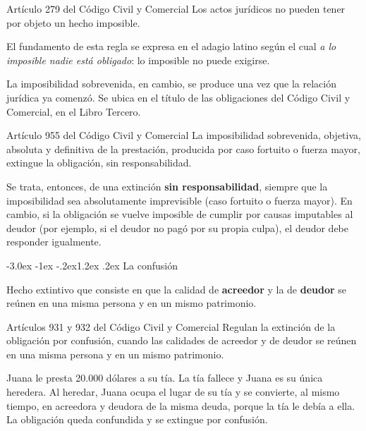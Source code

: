 \documentclass[12pt,oneside]{book}
\makeatletter
\renewcommand\section{\@startsection{section}{1}{\z@}%
  {-3.0ex \@plus -1ex \@minus -.2ex}{1.2ex \@plus .2ex}%
  {\normalfont\large\bfseries\color{acento}}}
\makeatother
\begin{document}
\begin{articulo}{Artículo 279 del Código Civil y Comercial}
Los actos jurídicos no pueden tener por objeto un hecho imposible.
\end{articulo}

El fundamento de esta regla se expresa en el adagio latino según el cual \textit{a lo imposible nadie está obligado}: lo imposible no puede exigirse.

La imposibilidad sobrevenida, en cambio, se produce una vez que la relación jurídica ya comenzó. Se ubica en el título de las obligaciones del Código Civil y Comercial, en el Libro Tercero.

\begin{articulo}{Artículo 955 del Código Civil y Comercial}
La imposibilidad sobrevenida, objetiva, absoluta y definitiva de la prestación, producida por caso fortuito o fuerza mayor, extingue la obligación, sin responsabilidad.
\end{articulo}

Se trata, entonces, de una extinción \textbf{sin responsabilidad}, siempre que la imposibilidad sea absolutamente imprevisible (caso fortuito o fuerza mayor). En cambio, si la obligación se vuelve imposible de cumplir por causas imputables al deudor (por ejemplo, si el deudor no pagó por su propia culpa), el deudor debe responder igualmente.

\section{La confusión}

\begin{definicion}[{Confusión}]
Hecho extintivo que consiste en que la calidad de \textbf{acreedor} y la de \textbf{deudor} se reúnen en una misma persona y en un mismo patrimonio.
\end{definicion}

\begin{articulo}{Artículos 931 y 932 del Código Civil y Comercial}
Regulan la extinción de la obligación por confusión, cuando las calidades de acreedor y de deudor se reúnen en una misma persona y en un mismo patrimonio.
\end{articulo}

\begin{ejemplo}
Juana le presta 20.000 dólares a su tía. La tía fallece y Juana es su única heredera. Al heredar, Juana ocupa el lugar de su tía y se convierte, al mismo tiempo, en acreedora y deudora de la misma deuda, porque la tía le debía a ella. La obligación queda confundida y se extingue por confusión.
\end{ejemplo}
\end{document}
